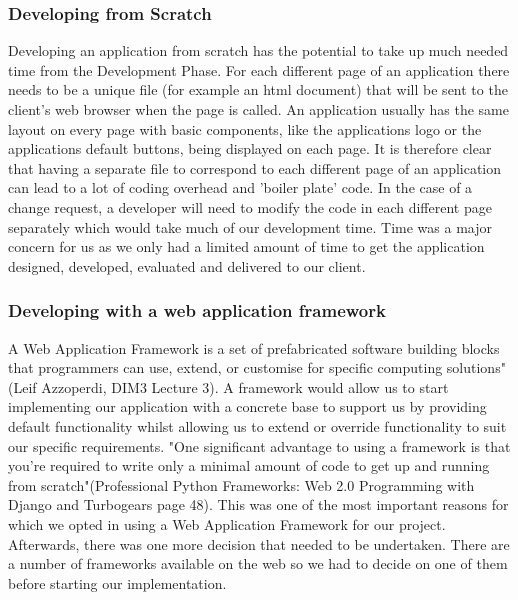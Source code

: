 \documentclass{l3proj}
\begin{document}
\subsubsection{ Developing from Scratch}
Developing an application from scratch has the potential to take up much needed time 
from the Development Phase. For each different page of an application there needs to be 
a unique file (for example an html document) that will be sent to the client's web browser 
when the page is called. An application usually has the same layout on every page with 
basic components, like the applications logo or the applications default buttons, being 
displayed on each page. It is therefore clear that having a separate file to correspond to 
each different page of an application can lead to a lot of coding overhead and 'boiler 
plate' code. In the case of a change request, a developer will need to modify the code in 
each different page separately which would take much of our development time. Time was a major concern for us as we only had a limited amount of time to get the application designed, developed, evaluated and delivered to our client. \subsubsection{Developing with a web application framework}
A Web Application Framework is a set of prefabricated software building blocks that 
programmers can use, extend, or customise for specific computing solutions" (Leif 
Azzoperdi, DIM3 Lecture 3). A framework would allow us to start implementing our 
application with a concrete base to support us by providing default functionality whilst 
allowing us to extend or override functionality to suit our specific requirements. "One 
significant advantage to using a framework is that you're required to write only a 
minimal amount of code to get up and running from scratch"(Professional Python 
Frameworks: Web 2.0 Programming with Django and Turbogears page 48). This was 
one of the most important reasons for which we opted in using a Web Application 
Framework for our project. Afterwards, there was one more decision that needed to be 
undertaken. There are a number of frameworks available on the web so we had to decide 
on one of them before starting our implementation. 
\end{document}
